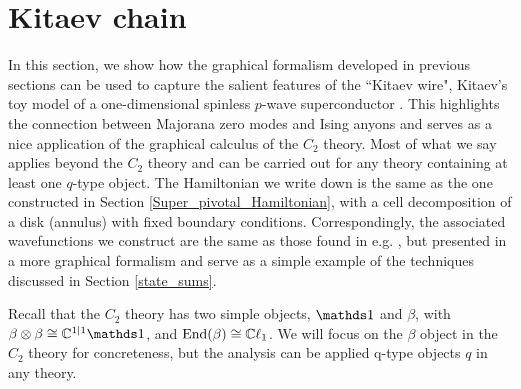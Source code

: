 
\section{Kitaev chain} \label{kitaev_wire}

In this section, we show how the graphical formalism developed in previous sections
can be used to capture the salient features of the ``Kitaev wire", 
Kitaev's toy model of a one-dimensional spinless $p$-wave superconductor \cite{kitaev2001}. 
This highlights the connection between Majorana zero modes and Ising anyons and serves 
as a nice application of the graphical calculus of the $C_2$ theory.
Most of what we say applies beyond the $C_2$ theory and can be carried out for any theory containing at least one $q$-type object.
The Hamiltonian we write down is the same as the one constructed in Section \ref{Super_pivotal_Hamiltonian}, with a cell decomposition of a disk (annulus) with fixed boundary conditions.
Correspondingly, the associated wavefunctions we construct
are the same as those found in e.g. \cite{fidkowski2011}, but presented in a more graphical formalism 
and serve as a simple example of the techniques discussed in Section \ref{state_sums}.

Recall that the $C_2$ theory has two simple objects, $\unit$ and $\beta$,
with $\beta\tp \beta\cong \cc^{1|1}\unit$,
and $\text{End}(\beta) \cong \mathbb{C}\ell_1$.
We will focus on the $\beta$ object in the $C_2$ 
theory for concreteness, but the analysis can be applied q-type objects $q$ in any theory.

